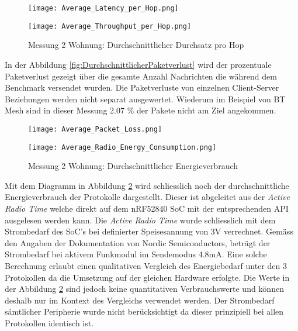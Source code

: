 \begin{figure}[!htbp]
	\centering
	\begin{minipage}[b]{0.49\textwidth}
		\centering
		\texttt{[image: Average\_Latency\_per\_Hop.png]}
		\caption{Messung 2 Wohnung: Durchschnittliche Latenzzeit pro Hop}
		\label{fig:DurchschnittlicheLatenzzeit}
	\end{minipage}
	\begin{minipage}[b]{0.49\textwidth}
		\centering
		\texttt{[image: Average\_Throughput\_per\_Hop.png]}
		\caption{Messung 2 Wohnung: Durchschnittlicher Durchsatz pro Hop}
		\label{fig:DurchschnittlicherDurchsatz}
	\end{minipage}
\end{figure}

In der Abbildung \ref{fig:DurchschnittlicherPaketverlust} wird der prozentuale Paketverlust gezeigt über die gesamte Anzahl Nachrichten die während dem Benchmark versendet wurden.
Die Paketverluste von einzelnen Client-Server Beziehungen werden nicht separat ausgewertet.
Wiederum im Beispiel von BT Mesh sind in dieser Messung 2.07 \% der Pakete nicht am Ziel angekommen.

\begin{figure}[!htbp]
	\centering
	\begin{minipage}[b]{0.49\textwidth}
		\centering
		\texttt{[image: Average\_Packet\_Loss.png]}
		\caption{Messung 2 Wohnung: Durchschnittlicher Paketverlust}
		\label{fig:DurchschnittlicherPaketverlust}
	\end{minipage}
	\begin{minipage}[b]{0.49\textwidth}
		\centering
		\texttt{[image: Average\_Radio\_Energy\_Consumption.png]}
		\caption{Messung 2 Wohnung: Durchschnittlicher Energieverbrauch}
		\label{fig:DurchschnittlicherEnergieverbrauch}
	\end{minipage}
\end{figure}

Mit dem Diagramm in Abbildung \ref{fig:DurchschnittlicherEnergieverbrauch} wird schliesslich noch der durchschnittliche Energieverbrauch der Protokolle dargestellt.
Dieser ist abgeleitet aus der \textit{Active Radio Time} welche direkt auf dem nRF52840 SoC mit der entsprechenden API ausgelesen werden kann.
Die \textit{Active Radio Time} wurde schliesslich mit dem Strombedarf des SoC's bei definierter Speisesannung von 3V verrechnet.
Gemäss den Angaben der Dokumentation von Nordic Semiconductors, beträgt der Strombedarf bei aktivem Funkmodul im Sendemodus 4.8mA.
Eine solche Berechnung erlaubt einen qualitativen Vergleich des Energiebedarf unter den 3 Protokollen da die Umsetzung auf der gleichen Hardware erfolgte.
Die Werte in der Abbildung \ref{fig:DurchschnittlicherEnergieverbrauch} sind jedoch keine quantitativen Verbrauchswerte und können deshalb nur im Kontext des Vergleichs verwendet werden.
Der Strombedarf sämtlicher Peripherie wurde nicht berücksichtigt da dieser prinzipiell bei allen Protokollen identisch ist.

